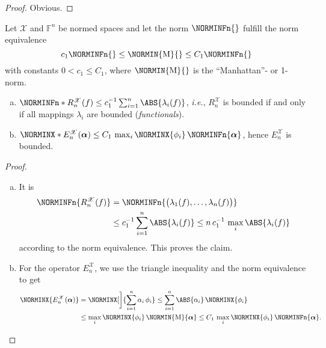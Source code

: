 \documentclass[a4paper]{paper}
\newcommand*{\SPC}[1]{{\ensuremath{\mathscr{#1}}}}
\newcommand*{\SPCX}{\SPC{X}}
\newcommand*{\FIELD}{{\ensuremath{\mathbb{F}}}}
\newcommand*{\Fn}{{\ensuremath{\FIELD^n}}}
\newcommand*{\EXT}[2]{\ensuremath{E_{#1}^{#2}}}
\newcommand*{\REST}[2]{\ensuremath{R_{#1}^{#2}}}
\newcommand*{\RnX}{{\ensuremath{\REST{n}{\SPC{X}}}}}
\newcommand*{\EnX}{{\ensuremath{\EXT{n}{\SPC{X}}}}}
\newcommand*{\ie}{\textsl{i.e.}\xspace}
\newcommand*{\BDalpha}{\boldsymbol{\alpha}}
\begin{document}
\begin{proof}
 Obvious.
\end{proof}


\begin{lemma}
 \label{lemma:specif:funct:op_prop_normedspace}
 Let $\SPCX$ and $\Fn$ be normed spaces and let the norm $\NORMINFn{}$ fulfill the norm equivalence
 \begin{equation*}
  c_1 \NORMINFn{} \leq \NORMIN{\mathrm{M}}{} \leq C_1 \NORMINFn{}
 \end{equation*}
 with constants $0 < c_1 \leq C_1$, where $\NORMIN{\mathrm{M}}{}$ is the ``Manhattan''- or 1-norm.

 \begin{enumerate}[(a)]
  \item \label{lemma:specif:funct:op_prop_normedspace:R_bounded}
  $\NORMINFn*{\RnX(f)} \leq c_1^{-1} \sum_{i=1}^n \ABS{\lambda_i(f)}$, \ie, $\RnX$ is bounded if and only if all 
  mappings $\lambda_i$ are bounded (\emph{functionals}).
  \item \label{lemma:specif:funct:op_prop_normedspace:E_bounded}
  $\NORMINX*{\EnX(\BDalpha)} \leq C_1\, \max_i \NORMINX{\phi_i}\, \NORMINFn{\BDalpha}$, hence $\EnX$ is bounded.
 \end{enumerate}
\end{lemma}
\vspace{1em}


\begin{proof}~
 \begin{enumerate}[(a)]
  \item It is
  \begin{align*}
   \NORMINFn{\RnX(f)} 
   &= \NORMINFn{\big( \lambda_1(f), \dots, \lambda_n(f) \big)} \\
   &\leq c_1^{-1} \sum_{i=1}^n \ABS{\lambda_i(f)} \leq n\,c_1^{-1}\, \max_i \ABS{\lambda_i(f)}
  \end{align*}
  according to the norm equivalence. This proves the claim.
  
  \item For the operator $\EnX$, we use the triangle inequality and the norm equivalence to get
  \begin{align*}
   \NORMINX{\EnX(\BDalpha)} 
   &= \NORMINX[\bigg]{\sum_{i=1}^n \alpha_i\, \phi_i} \leq \sum_{i=1}^n \ABS{\alpha_i}\, \NORMINX{\phi_i} 
\\
   &\leq \max_i \NORMINX{\phi_i}\, \NORMIN{\mathrm{M}}{\BDalpha} \leq C_1\, \max_i \NORMINX{\phi_i}\, 
   \NORMINFn{\BDalpha}.
  \end{align*}
 \end{enumerate}
\end{proof}
\end{document}
